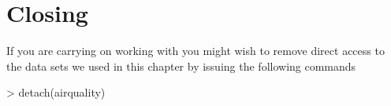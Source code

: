 
\section{Closing} 
 
If you are carrying on working with \R{} you might wish to remove direct access to the data sets we used in this chapter by issuing the following commands 

\begin{Schunk}
\begin{Sinput}
> detach(airquality) 
\end{Sinput}
\end{Schunk}



